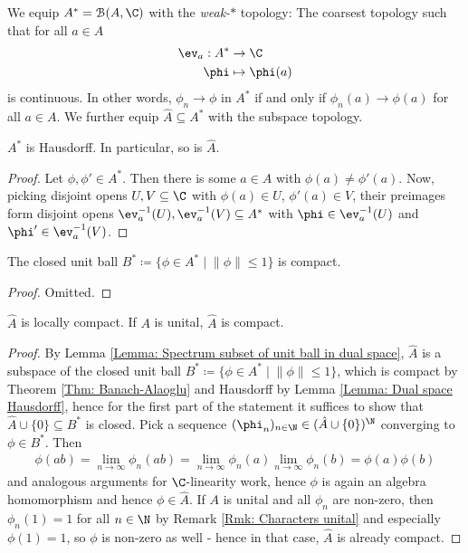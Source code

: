 \documentclass[american]{scrartcl}
\renewcommand{\norm}[1]{\left\lVert #1 \right\rVert}
\newcommand{\cB}{\mathcal{B}}
\newcommand{\inv}{^{-1}}
\begin{document}
\begin{definition}
	We equip $A^*=\cB(A,\C)$ with the \textit{weak-$*$} topology: The coarsest topology such that for all $a\in A$
	\begin{align*}
		\ev_a:A^*&\to \C\\
		\phi &\mapsto \phi(a)
	\end{align*}
	is continuous. In other words, $\phi_n\to \phi$ in $A^*$ if and only if $\phi_n(a)\to \phi(a)$ for all $a\in A$.
	We further equip $\hat{A}\subseteq A^*$ with the subspace topology.
\end{definition}
\begin{lemma}\label{Lemma: Dual space Hausdorff}
	$A^*$ is Hausdorff. In particular, so is $\hat{A}$.
\end{lemma}
\begin{proof}
	Let $\phi,\phi'\in A^*$. Then there is some $a\in A$ with $\phi(a)\neq \phi'(a)$. Now, picking disjoint opens $U, V\subseteq \C$ with $\phi(a)\in U$, $\phi'(a)\in V$, their preimages form disjoint opens $\ev_a\inv(U), \ev_a\inv(V)\subseteq A^*$ with $\phi\in \ev_a\inv(U)$ and $\phi'\in \ev_a\inv(V)$.
\end{proof}
\begin{theorem}\label{Thm: Banach-Alaoglu}
	The closed unit ball $B^*\coloneqq \{\phi\in A^*\mid \norm{\phi}\leq 1\}$ is compact.
\end{theorem}
\begin{proof}
	Omitted.
\end{proof}
\begin{proposition}
	$\hat{A}$ is locally compact. If $A$ is unital, $\hat{A}$ is compact.
\end{proposition}
\begin{proof}
	By Lemma \ref{Lemma: Spectrum subset of unit ball in dual space}, $\hat{A}$ is a subspace of the closed unit ball $B^*\coloneqq \{\phi\in A^*\mid \norm{\phi}\leq 1\}$, which is compact by Theorem \ref{Thm: Banach-Alaoglu} and Hausdorff by Lemma \ref{Lemma: Dual space Hausdorff}, hence for the first part of the statement it suffices to show that $\hat{A}\cup \{0\}\subseteq B^*$ is closed. Pick a sequence $(\phi_n)_{n\in \N}\in (\hat{A}\cup\{0\})^{\N}$ converging to $\phi\in B^*$. Then
	\begin{align*}
		\phi(ab)=\lim_{n\to\infty}\phi_n(ab)=\lim_{n\to\infty}\phi_n(a)\lim_{n\to\infty}\phi_n(b)=\phi(a)\phi(b)
	\end{align*}
	and analogous arguments for $\C$-linearity work, hence $\phi$ is again an algebra homomorphism and hence $\phi\in \hat{A}$. If $A$ is unital and all $\phi_n$ are non-zero, then $\phi_n(1)=1$ for all $n\in\N$ by Remark \ref{Rmk: Characters unital} and especially $\phi(1)=1$, so $\phi$ is non-zero as well - hence in that case, $\hat{A}$ is already compact.
\end{proof}
\end{document}
